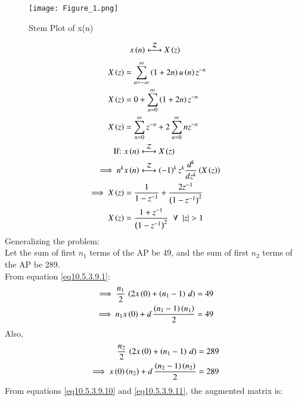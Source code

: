 \documentclass[journal,12pt,twocolumn]{IEEEtran}
\theoremstyle{remark}
\begin{document}
\begin{figure}[h]
    \renewcommand\thefigure{1}
    \centering
    \captionsetup{justification=centering}
    \texttt{[image: Figure\_1.png]}
    \caption{Stem Plot of x(n)}
    \label{stemplot}
\end{figure}
\begin{align}
    x\brak{n}\system{Z}X\brak{z}
\end{align}
\begin{align}
    X\brak{z}&= \sum_{n=-\infty}^{\infty}\brak{1+2n}u\brak{n} z^{-n}\\
    X\brak{z}&=0+\sum_{n=0}^{\infty}\brak{1+2n} z^{-n}\\
    X\brak{z}&=\sum_{n=0}^{\infty}z^{-n}+2\sum_{n=0}^{\infty}nz^{-n}\\
    \text{If: }\notag &x\brak{n}\system{Z}X\brak{z}\\
    \implies n^k&x\brak{n}\system{Z}\brak{-1}^{k}z^k\frac{d^k}{dz^k}\brak{X\brak{z}}\notag\\
    \implies X\brak{z}&=\frac{1}{1-z^{-1}}+\frac{2z^{-1}}{\brak{1-z^{-1}}^2}\\
    X\brak{z}&=\frac{1+z^{-1}}{\brak{1-z^{-1}}^2} \;\;\forall\;\;|z|>1
\end{align}
Generalizing the problem:\\
Let the sum of first $n_1$ terms of the AP be 49, and the sum of first $n_2$ terms of the AP be 289.\\
From equation \ref{eq10.5.3.9.1}:
\begin{align}
\implies \frac{n_1}{2}\,\left(2x\left(0\right)+\left(n_1-1\right)\,d\right)&=49\\
\implies n_1x\left(0\right)+ d\,\frac{\left(n_1-1\right)\left(n_1\right)}{2}&=49\label{eq10.5.3.9.10}
\end{align}
Also,
\begin{align}
\frac{n_2}{2}\,\left(2x\left(0\right)+\left(n_1-1\right)\,d\right)&=289\\
\implies x\left(0\right)\left(n_2\right)+ d\,\frac{\left(n_2-1\right)\left(n_2\right)}{2}&=289\label{eq10.5.3.9.11}
\end{align}
From  equations \ref{eq10.5.3.9.10} and \ref{eq10.5.3.9.11}, the augmented matrix is:
\end{document}

